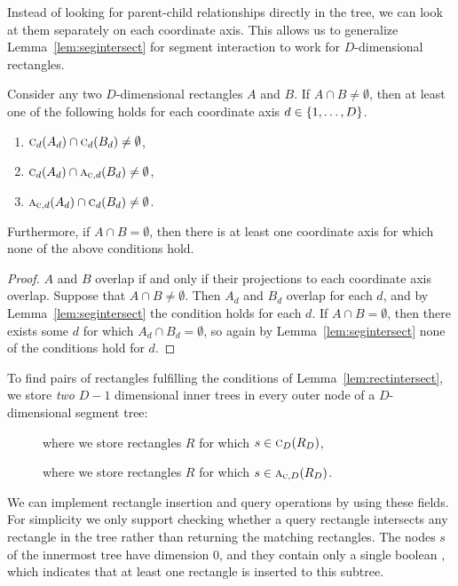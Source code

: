 \documentclass[english,gradu]{tktltiki2018}
\begin{document}
Instead of looking for parent-child relationships directly in the tree, we can look at them separately on each coordinate axis.
This allows us to generalize Lemma~\ref{lem:segintersect} for segment interaction to work for $D$-dimensional rectangles.

\begin{lem}\label{lem:rectintersect}Consider any two $D$-dimensional rectangles $A$ and $B$.
If $A\cap B\neq\emptyset$, then at least one of the following holds for each coordinate axis $d\in\set{1,\dots,D}$.
\begin{enumerate}
\item $\canoni{A_d}{d}\cap\canoni{B_d}{d}\neq\emptyset$,
\item $\canoni{A_d}{d}\cap\canonpari{B_d}{d}\neq\emptyset$,
\item $\canonpari{A_d}{d}\cap\canoni{B_d}{d}\neq\emptyset$.
\end{enumerate}
Furthermore, if $A\cap B=\emptyset$, then there is at least one coordinate axis for which none of the above conditions hold.
\end{lem}
\begin{proof}
$A$ and $B$ overlap if and only if their projections to each coordinate axis overlap.
Suppose that $A\cap B\neq\emptyset$.
Then $A_d$ and $B_d$ overlap for each $d$, and by Lemma~\ref{lem:segintersect} the condition holds for each $d$.
If $A\cap B=\emptyset$, then there exists some $d$ for which $A_d\cap B_d=\emptyset$, so again by Lemma~\ref{lem:segintersect} none of the conditions hold for $d$.
\end{proof}

To find pairs of rectangles fulfilling the conditions of Lemma~\ref{lem:rectintersect}, we store \emph{two} $D-1$ dimensional inner trees in every outer node of a $D$-dimensional segment tree:
\begin{description}
\item[] where we store rectangles $R$ for which $s\in\canoni{R_D}{D}$,
\item[] where we store rectangles $R$ for which $s\in\canonpari{R_D}{D}$.
\end{description}

We can implement rectangle insertion and query operations by using these fields.
For simplicity we only support checking whether a query rectangle intersects any rectangle in the tree rather than returning the matching rectangles.
The nodes $s$ of the innermost tree have dimension 0, and they contain only a single boolean , which indicates that at least one rectangle is inserted to this subtree.
\end{document}
